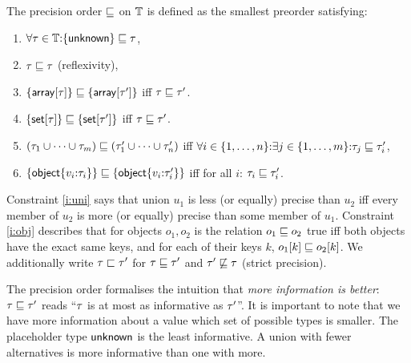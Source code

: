 The precision order $\sqsubseteq$ on $\mathbb{T}$ is defined as the smallest preorder satisfying:
\begin{enumerate}
  \item $\forall\tau \in \mathbb{T}{:}\{\mathsf{unknown}\} \sqsubseteq \tau$,
  \item $\tau \sqsubseteq \tau$ (reflexivity),
  \item $\{\mathsf{array}[{\tau}]\} \sqsubseteq \{\mathsf{array}[{\tau'}]\}$ iff $\tau \sqsubseteq \tau'$.
  \item $\{\mathsf{set}[{\tau}]\} \sqsubseteq \{\mathsf{set}[{\tau'}]\}$ iff $\tau \sqsubseteq \tau'$.
  \item $(\tau_1 \cup \cdots \cup \tau_m) \sqsubseteq (\tau_1' \cup \cdots \cup \tau_n')$ iff $\forall i \in \{1,\ldots,n\}{:} \exists j \in \{1,\ldots,m\}{:} \tau_j \sqsubseteq \tau_i'$, \label{i:uni}
  \item $\{\mathsf{object}\{v_i{:}\tau_i\}\} \sqsubseteq \{\mathsf{object}\{v_i{:}\tau_i'\}\}$
     iff for all $i$: $\tau_i \sqsubseteq \tau_i'$. \label{i:obj}
\end{enumerate}
Constraint \ref{i:uni} says that union $u_1$ is less (or equally) precise than $u_2$ iff every member of $u_2$ is more (or equally) precise than some member of $u_1$.
Constraint \ref{i:obj} describes that for objects $o_1,o_2$ is the relation $o_1 \sqsubseteq o_2$ true iff both objects have the exact same keys, and for each of their keys $k$, $o_1[k] \sqsubseteq o_2[k]$.
We additionally write $\tau \sqsubset \tau'$ for $\tau \sqsubseteq \tau'$ and $\tau' \not\sqsubseteq \tau$ (strict precision).

The precision order formalises the intuition that \emph{more information is better}: $\tau \sqsubseteq \tau'$ reads ``$\tau$ is at most as informative as $\tau'$''.
It is important to note that we have more information about a value which set of possible types is smaller.
The placeholder type $\mathsf{unknown}$ is the least informative.
A union with fewer alternatives is more informative than one with more.

